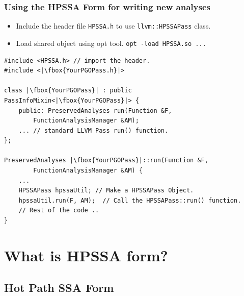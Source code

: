 \documentclass[aspectratio=169, compress]{beamer}
\begin{document}
\begin{frame}[fragile]
	\frametitle{Using the HPSSA Form for writing new analyses}
	\begin{itemize}
		\item Include the header file \texttt{HPSSA.h} to use  \texttt{llvm::HPSSAPass} class.
		\item Load shared object using opt tool. \texttt{opt -load HPSSA.so ...} 
	\end{itemize}
	\begin{verbatim}
#include <HPSSA.h> // import the header.
#include <|\fbox{YourPGOPass.h}|>

class |\fbox{YourPGOPass}| : public PassInfoMixin<|\fbox{YourPGOPass}|> {
	public: PreservedAnalyses run(Function &F, 
		FunctionAnalysisManager &AM);
	... // standard LLVM Pass run() function.
};

PreservedAnalyses |\fbox{YourPGOPass}|::run(Function &F, 
		FunctionAnalysisManager &AM) {
	...
	HPSSAPass hpssaUtil; // Make a HPSSAPass Object.
	hpssaUtil.run(F, AM);  // Call the HPSSAPass::run() function.
	// Rest of the code ..
}
	\end{verbatim}
\end{frame}
\section{What is HPSSA form?}
\subsection{Hot Path SSA Form}
{
	
}
\end{document}
